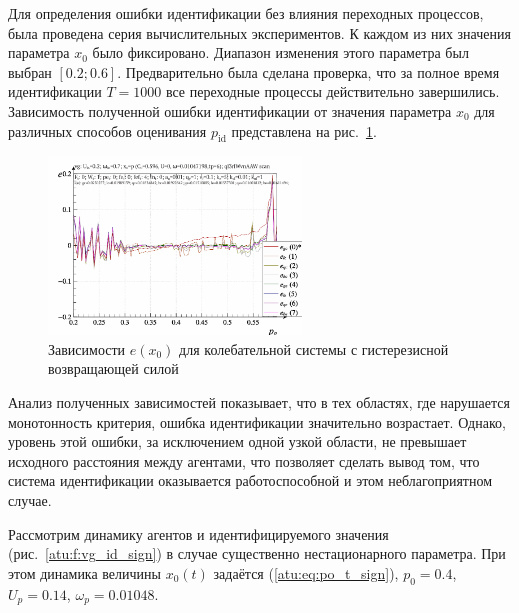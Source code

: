 Для определения ошибки идентификации без влияния переходных процессов,
была проведена серия вычислительных экспериментов.
К каждом из них значения параметра $x_0$ было фиксировано.
Диапазон изменения этого параметра был выбран $[0.2 ; 0.6]$.
Предварительно была сделана проверка, что за полное время идентификации
$T= 1000$ все переходные процессы действительно завершились.
Зависимость полученной ошибки идентификации от значения
параметра $x_0$ для различных способов оценивания $p_\mathrm{id}$
представлена на рис.~\ref{atu:f:vg_id_scan}.

\begin{figure}[ht!]
\begin{center}
  \includegraphics[width=0.60\textwidth]{p/cha/vg/vg_id-p_p_e_ql3rlWvnAAW_scan.png}
\end{center}
  \caption{Зависимости $e(x_0) $ для колебательной системы с гистерезисной возвращающей силой}
\label{atu:f:vg_id_scan}
\end{figure}

Анализ полученных зависимостей показывает, что в тех областях, где нарушается монотонность
критерия, ошибка идентификации значительно возрастает.
Однако, уровень этой ошибки, за исключением одной узкой области,
не превышает исходного расстояния между агентами,
что позволяет сделать вывод том, что система идентификации оказывается работоспособной
и этом неблагоприятном случае.

Рассмотрим динамику агентов и идентифицируемого значения (рис.~\ref{atu:f:vg_id_sign}) в случае
существенно нестационарного параметра.
При этом динамика величины $x_0(t)$ задаётся (\ref{atu:eq:po_t_sign}),
$p_0=0.4$, $U_p=0.14$, $\omega_p= 0.01048$.

